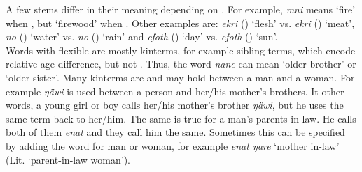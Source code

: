 A few stems differ in their meaning depending on . For example, \emph{mni} means `fire' when , but `firewood' when . Other examples are: \emph{ekri} (\F) `flesh' vs. \emph{ekri} (\Masc) `meat', \emph{no} (\F) `water' vs. \emph{no}  (\Masc) `rain' and \emph{efoth} (\F) `day' vs. \emph{efoth} (\Masc) `sun'.\\

Words with flexible  are mostly kinterms, for example sibling terms, which encode relative age difference, but not . Thus, the word \emph{nane} can mean `older brother' or `older sister'. Many kinterms are  and may hold between a man and a woman. For example \emph{ŋäwi} is used between a person and her/his mother's brothers. It other words, a young girl or boy calls her/his mother's brother \emph{ŋäwi}, but he uses the same term back to her/him. The same is true for a man's parents in-law. He calls both of them \emph{enat} and they call him the same. Sometimes this can be specified by adding the word for man or woman, for example \emph{enat ŋare} `mother in-law' (Lit. `parent-in-law woman').

